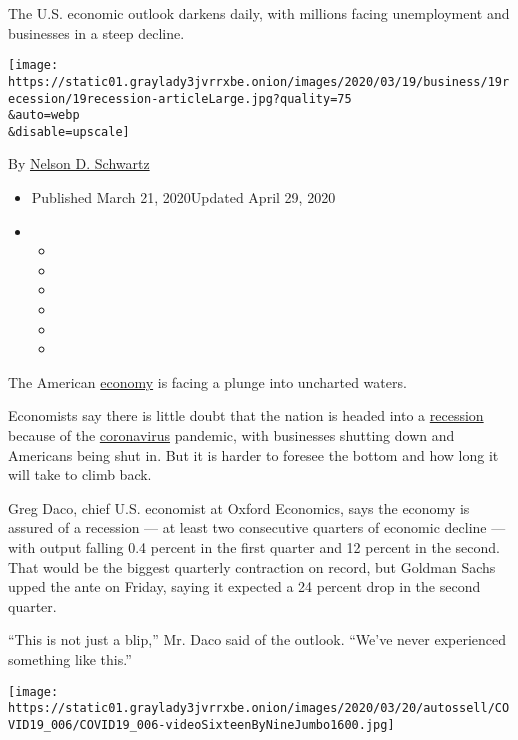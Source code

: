 The U.S. economic outlook darkens daily, with millions facing
unemployment and businesses in a steep decline.

\texttt{[image: https://static01.graylady3jvrrxbe.onion/images/2020/03/19/business/19recession/19recession-articleLarge.jpg?quality=75\\\&auto=webp\\\&disable=upscale]}

By \href{https://www.nytimes3xbfgragh.onion/by/nelson-d-schwartz}{Nelson
D. Schwartz}

\begin{itemize}
\item
  Published March 21, 2020Updated April 29, 2020
\item
  \begin{itemize}
  \item
  \item
  \item
  \item
  \item
  \item
  \end{itemize}
\end{itemize}

The American
\href{https://www.nytimes3xbfgragh.onion/2020/04/29/business/economy/us-gdp.html}{economy}
is facing a plunge into uncharted waters.

Economists say there is little doubt that the nation is headed into a
\href{https://www.nytimes3xbfgragh.onion/2020/04/01/business/economy/coronavirus-recession.html}{recession}
because of the
\href{https://www.nytimes3xbfgragh.onion/2020/04/01/business/economy/coronavirus-recession.html}{coronavirus}
pandemic, with businesses shutting down and Americans being shut in. But
it is harder to foresee the bottom and how long it will take to climb
back.

Greg Daco, chief U.S. economist at Oxford Economics, says the economy is
assured of a recession --- at least two consecutive quarters of economic
decline --- with output falling 0.4 percent in the first quarter and 12
percent in the second. That would be the biggest quarterly contraction
on record, but Goldman Sachs upped the ante on Friday, saying it
expected a 24 percent drop in the second quarter.

``This is not just a blip,'' Mr. Daco said of the outlook. ``We've never
experienced something like this.''

\texttt{[image: https://static01.graylady3jvrrxbe.onion/images/2020/03/20/autossell/COVID19\_006/COVID19\_006-videoSixteenByNineJumbo1600.jpg]}

